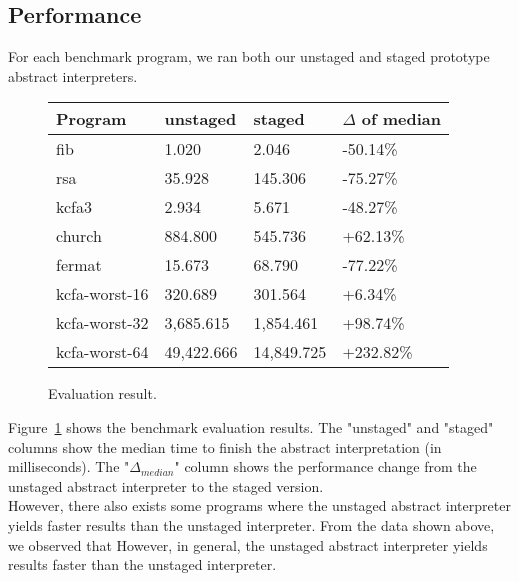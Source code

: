 \subsection{Performance}

For each benchmark program, we ran both our unstaged and staged prototype abstract interpreters.

\begin{figure}[h]
\begin{tabular}{@{}llll@{}}
\toprule
    Program            & unstaged   & staged     & $\Delta$ of median \\ \midrule
    fib                & 1.020      & 2.046      & -50.14\%          \\
    rsa                & 35.928     & 145.306    & -75.27\%          \\
    kcfa3              & 2.934      & 5.671      & -48.27\%          \\
    church             & 884.800    & 545.736    & +62.13\%          \\
    fermat             & 15.673     & 68.790     & -77.22\%          \\
    kcfa-worst-16      & 320.689    & 301.564    & +6.34\%           \\
    kcfa-worst-32      & 3,685.615  & 1,854.461  & +98.74\%          \\
    kcfa-worst-64      & 49,422.666 & 14,849.725 & +232.82\%         \\
    \bottomrule
\end{tabular}
\caption{Evaluation result.} \label{evaluation_result}
\end{figure}

Figure~\ref{evaluation_result} shows the benchmark evaluation results. The "unstaged" and "staged" columns
show the median time to finish the abstract interpretation (in milliseconds). The "$\Delta_{median}$"
column shows the performance change from the unstaged abstract interpreter to the staged version.\\

However, there also exists some programs where the unstaged abstract interpreter yields 
faster results than the unstaged interpreter.
From the data shown above, we observed that 
However, in general, the unstaged abstract interpreter yields results faster
than the unstaged interpreter.

